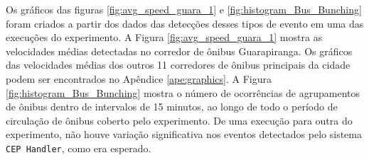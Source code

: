 Os gráficos das figuras \ref{fig:avg_speed_guara_1} e \ref{fig:histogram_Bus_Bunching} foram criados a partir dos dados das detecções desses tipos de evento em uma das execuções do experimento. A Figura  \ref{fig:avg_speed_guara_1} mostra as velocidades médias detectadas no corredor de ônibus Guarapiranga. Os gráficos das velocidades médias dos outros 11 corredores de ônibus principais da cidade podem ser encontrados no Apêndice \ref{ape:graphics}. A Figura \ref{fig:histogram_Bus_Bunching} mostra o número de ocorrências de agrupamentos de ônibus dentro de intervalos de 15 minutos, ao longo de todo o período de circulação de ônibus coberto pelo experimento. De uma execução para outra do experimento, não houve variação significativa nos eventos detectados pelo sistema \texttt{CEP Handler}, como era esperado. 





